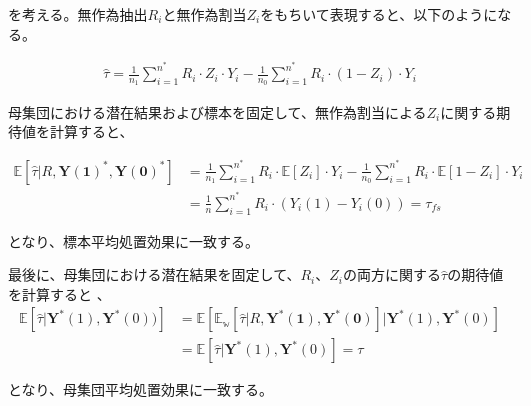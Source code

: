 \documentclass[a4paper]{bxjsarticle}
\begin{document}
を考える。無作為抽出$R_i$と無作為割当$Z_i$をもちいて表現すると、以下のようになる。

\begin{equation}
\begin{split}
\hat{\tau} = \frac{1}{n_1} \sum_{i=1}^{n{^\ast}} R_i \cdot Z_i \cdot Y_i - \frac{1}{n_0} \sum_{i=1}^{n^\ast} R_i \cdot (1-Z_i) \cdot Y_i 
\end{split}
\end{equation}

母集団における潜在結果および標本を固定して、無作為割当による$Z_i$に関する期待値を計算すると、

\begin{equation}
\begin{split}
\mathbb{E} \left[ \hat{\tau} |R, \mathbf{ Y(1)^\ast,Y(0)^\ast} \right] &= \frac{1}{n_1} \sum_{i=1}^{n^\ast} R_i \cdot \mathbb{E}[Z_i] \cdot Y_i - \frac{1}{n_0} \sum_{i=1}^{n^\ast} R_i \cdot \mathbb{E} [1-Z_i] \cdot Y_i \\
&= \frac{1}{n} \sum_{i=1}^{n^\ast} R_i \cdot (Y_i(1) - Y_i(0)) = \tau_{fs}
\end{split}
\end{equation}

となり、標本平均処置効果に一致する。

最後に、母集団における潜在結果を固定して、$R_i$、$Z_i$の両方に関する$\hat{\tau}$の期待値を計算すると
、
\begin{equation}
\begin{split}
\mathbb{E}\left[ \hat{\tau}|  \mathbf{Y^{\ast}}(1), \mathbf{Y^{\ast}}(0))  \right] &= \mathbb{E} \left[ \mathbb{E}_{\mathbb{w}} \left[ \hat{\tau} | R, \mathbf{Y^\ast(1),Y^\ast(0)} \right] | \mathbf{Y}^\ast(1), \mathbf{Y}^\ast(0) \right] \\\
&= \mathbb{E} \left[ \hat{\tau} |  \mathbf{Y}^\ast(1), \mathbf{Y}^\ast(0) \right]  = \tau
\end{split}
\end{equation}

となり、母集団平均処置効果に一致する。
\end{document}
